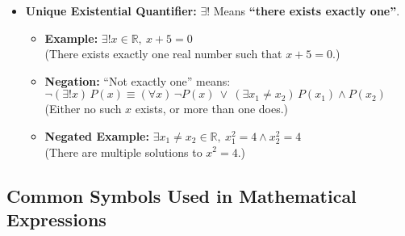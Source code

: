 \begin{itemize}[label=\(-\)]
	\item\textbf{Unique Existential Quantifier:}  \(\exists\)!
		Means \textbf{``there exists exactly one''}.

		\begin{itemize}
			\item \textbf{Example:}  \(\exists! x \in \mathbb{R},\ x + 5 = 0\) \\
			      (There exists exactly one real number such that \( x + 5 = 0 \).)

			\item \textbf{Negation:}  ``Not exactly one'' means:
			      \(
				      \neg (\exists! x)\, P(x) \equiv (\forall x)\, \neg P(x)\ \lor\ (\exists x_1 \neq x_2)\, P(x_1) \land P(x_2)
			      \)
			      (Either no such \( x \) exists, or more than one does.)

			\item \textbf{Negated Example:}  \(\exists x_1 \neq x_2 \in \mathbb{R},\ x_1^2 = 4 \land x_2^2 = 4\) \\
			      (There are multiple solutions to \( x^2 = 4 \).)
		\end{itemize}

\end{itemize}
\subsection{Common Symbols Used in Mathematical Expressions}

